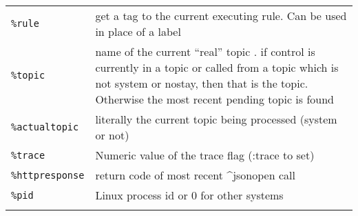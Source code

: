 \documentclass[]{article}
\begin{document}
\begin{longtable}[]{@{}ll@{}}
\begin{minipage}[t]{0.12\columnwidth}\raggedright\strut
\texttt{\%rule}\strut
\end{minipage} & \begin{minipage}[t]{0.10\columnwidth}\raggedright\strut
get a tag to the current executing rule. Can be used in place of a
label\strut
\end{minipage}\tabularnewline
\begin{minipage}[t]{0.12\columnwidth}\raggedright\strut
\texttt{\%topic}\strut
\end{minipage} & \begin{minipage}[t]{0.10\columnwidth}\raggedright\strut
name of the current ``real'' topic . if control is currently in a topic
or called from a topic which is not system or nostay, then that is the
topic. Otherwise the most recent pending topic is found\strut
\end{minipage}\tabularnewline
\begin{minipage}[t]{0.12\columnwidth}\raggedright\strut
\texttt{\%actualtopic}\strut
\end{minipage} & \begin{minipage}[t]{0.10\columnwidth}\raggedright\strut
literally the current topic being processed (system or not)\strut
\end{minipage}\tabularnewline
\begin{minipage}[t]{0.12\columnwidth}\raggedright\strut
\texttt{\%trace}\strut
\end{minipage} & \begin{minipage}[t]{0.10\columnwidth}\raggedright\strut
Numeric value of the trace flag (:trace to set)\strut
\end{minipage}\tabularnewline
\begin{minipage}[t]{0.12\columnwidth}\raggedright\strut
\texttt{\%httpresponse}\strut
\end{minipage} & \begin{minipage}[t]{0.10\columnwidth}\raggedright\strut
return code of most recent \^{}jsonopen call\strut
\end{minipage}\tabularnewline
\begin{minipage}[t]{0.12\columnwidth}\raggedright\strut
\texttt{\%pid}\strut
\end{minipage} & \begin{minipage}[t]{0.10\columnwidth}\raggedright\strut
Linux process id or 0 for other systems\strut
\end{minipage}\tabularnewline
\begin{minipage}[t]{0.12\columnwidth}\raggedright\strut

\end{minipage}
\end{longtable}
\end{document}
